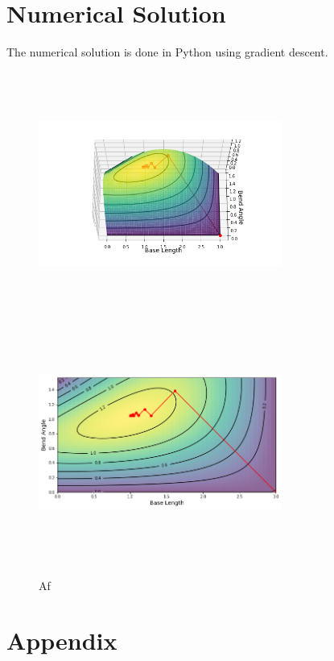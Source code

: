 \documentclass{article}
\begin{document}
\section*{Numerical Solution}
The numerical solution is done in Python using gradient descent. 
\begin{figure}[h]
\includegraphics[width = 8cm, height = 8cm]{p3.png}
\includegraphics[width = 8cm, height = 8cm]{p4.png}
\caption{Af }
\end{figure}

\section*{Appendix}
\end{document}
